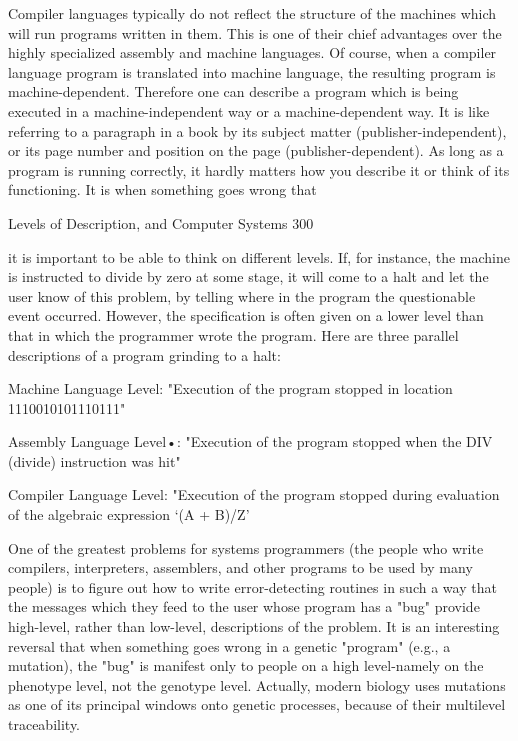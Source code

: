       Compiler languages typically do not reflect the structure of the machines which
       will run programs written in them. This is one of their chief advantages over the
       highly specialized assembly and machine languages. Of course, when a compiler
       language program is translated into machine language, the resulting program is
       machine-dependent. Therefore one can describe a program which is being
       executed in a machine-independent way or a machine-dependent way. It is like
       referring to a paragraph in a book by its subject matter (publisher-independent), or
       its page number and position on the page (publisher-dependent).
               As long as a program is running correctly, it hardly matters how you
       describe it or think of its functioning. It is when something goes wrong that




Levels of Description, and Computer Systems                                            300

       it is important to be able to think on different levels. If, for instance, the machine
       is instructed to divide by zero at some stage, it will come to a halt and let the user
       know of this problem, by telling where in the program the questionable event
       occurred. However, the specification is often given on a lower level than that in
       which the programmer wrote the program. Here are three parallel descriptions of
       a program grinding to a halt:

       Machine Language Level:
             "Execution of the program stopped in location 1110010101110111"

       Assembly Language Level•:
             "Execution of the program stopped when the DIV (divide) instruction was
             hit"

       Compiler Language Level:
             "Execution of the program stopped during evaluation of the algebraic
             expression `(A + B)/Z'

       One of the greatest problems for systems programmers (the people who write
       compilers, interpreters, assemblers, and other programs to be used by many
       people) is to figure out how to write error-detecting routines in such a way that
       the messages which they feed to the user whose program has a "bug" provide
       high-level, rather than low-level, descriptions of the problem. It is an interesting
       reversal that when something goes wrong in a genetic "program" (e.g., a
       mutation), the "bug" is manifest only to people on a high level-namely on the
       phenotype level, not the genotype level. Actually, modern biology uses mutations
       as one of its principal windows onto genetic processes, because of their multilevel
       traceability.

